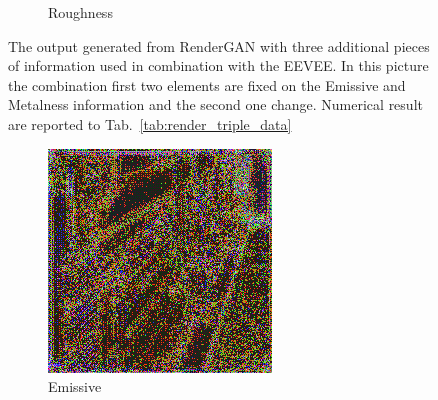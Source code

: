 \begin{figure}[h!]
\begin{subfigure}[b]{0.175\textwidth}
     \caption{Roughness}
    \end{subfigure}
    \caption[Generation Result with fixed input on Emissive and Metalness]{The output generated from RenderGAN with three additional pieces of information used in combination with the EEVEE. In this picture the combination first two elements are fixed on the Emissive and Metalness information and the second one change. Numerical result are reported to Tab.~\ref{tab:render_triple_data}}
    \label{fig:triple_input_base_emissive_metalness}
\end{figure}

\begin{figure}[h!]
    \centering
    \begin{subfigure}[b]{0.175\textwidth}
     \includegraphics[width=\textwidth]{figures/result/quadruple/depth_albedo_normal_emissive/1.png}
     \caption{Emissive}\label{subfig:1}
    \end{subfigure}
    ~
    \begin{subfigure}[b]{0.175\textwidth}

\end{subfigure}
\end{figure}
